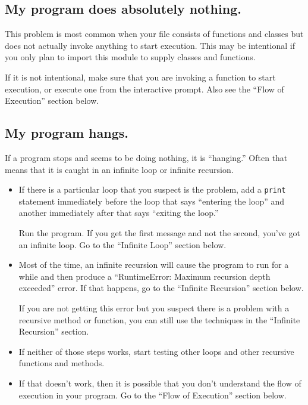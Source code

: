 \documentclass[10pt]{book}
\begin{document}
\subsection{My program does absolutely nothing.}

This problem is most common when your file consists of functions and
classes but does not actually invoke anything to start execution.
This may be intentional if you only plan to import this module to
supply classes and functions.

If it is not intentional, make sure that you
are invoking a function to start execution, or execute one from
the interactive prompt.  Also see the ``Flow of Execution'' section
below.


\subsection{My program hangs.}

If a program stops and seems to be doing nothing, it is ``hanging.''
Often that means that it is caught in an infinite loop or infinite
recursion.

\begin{itemize}

\item If there is a particular loop that you suspect is the
problem, add a {\tt print} statement immediately before the loop that says
``entering the loop'' and another immediately after that says
``exiting the loop.''

Run the program.  If you get the first message and not the second,
you've got an infinite loop.  Go to the ``Infinite Loop'' section
below.

\item Most of the time, an infinite recursion will cause the program
to run for a while and then produce a ``RuntimeError: Maximum
recursion depth exceeded'' error.  If that happens, go to the
``Infinite Recursion'' section below.

If you are not getting this error but you suspect there is a problem
with a recursive method or function, you can still use the techniques
in the ``Infinite Recursion'' section.

\item If neither of those steps works, start testing other
loops and other recursive functions and methods.

\item If that doesn't work, then it is possible that
you don't understand the flow of execution in your program.
Go to the ``Flow of Execution'' section below.

\end{itemize}
\end{document}
